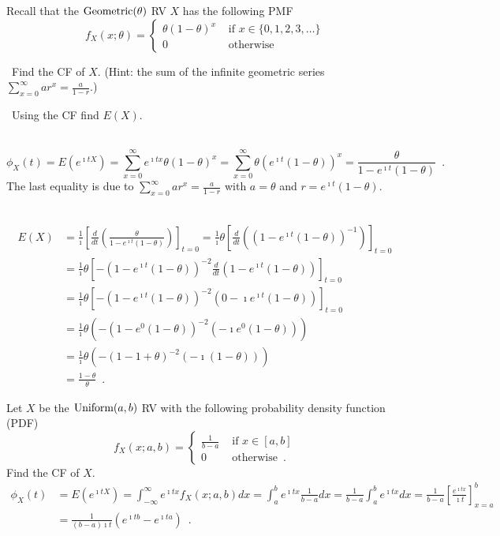 \begin{ExerciseList}
\Exercise
Recall that the $\mbox{{\rm Geometric}}(\theta)$ RV $X$ has the following PMF
\[
f_X(x;\theta) = 
\begin{cases}
\theta (1-\theta)^x & \text{ if } x \in \{0,1,2,3,\ldots\}\\
0 & \text{ otherwise}
\end{cases}
\]
\be
\item~Find the CF of $X$. (Hint: the sum of the infinite geometric series $\sum_{x=0}^{\infty} a r^x = \frac{a}{1-r}$.)
\item~Using the CF find $E(X)$.
\ee
\Answer
~\\
\be
\item~
\[
\phi_X(t) = E \left(e^{\imath t X}\right) = \sum_{x=0}^{\infty} e^{\imath t x}\theta(1-\theta)^x
= \sum_{x=0}^{\infty} \theta \left(e^{\imath t} (1-\theta)\right)^x = \frac{\theta}{1-e^{\imath t} (1-\theta)} \enspace .
\]
The last equality is due to $\sum_{x=0}^{\infty} a r^x = \frac{a}{1-r}$ with $a=\theta$ and $r=e^{\imath t} (1-\theta)$.
\item~
\begin{align*}
E(X)
&= \frac{1}{\imath} \left[ \frac{d}{dt} \left( \frac{\theta}{1-e^{\imath t}(1-\theta)} \right) \right]_{t=0} 
=  \frac{1}{\imath} \theta \left[ \frac{d}{dt} \left( \left(1-e^{\imath t}(1-\theta)\right)^{-1} \right) \right]_{t=0} \\
&= \frac{1}{\imath} \theta \left[ -\left(1-e^{\imath t} (1-\theta)\right)^{-2} \frac{d}{dt} \left( 1-e^{\imath t}(1-\theta)\right) \right]_{t=0}\\ 
&= \frac{1}{\imath} \theta \left[ -\left(1-e^{\imath t} (1-\theta)\right)^{-2} \left( 0-\imath e^{\imath t}(1-\theta)\right) \right]_{t=0}\\
&= \frac{1}{\imath} \theta \left( -\left(1-e^{0} (1-\theta)\right)^{-2} \left( -\imath e^{0}(1-\theta)\right) \right)\\ 
&= \frac{1}{\imath} \theta \left( -\left(1- 1+\theta\right)^{-2} \left( -\imath (1-\theta)\right) \right)\\
&=\frac{1-\theta}{\theta} \enspace .
\end{align*}
\ee

\Exercise
Let $X$ be the $\mbox{{\rm Uniform}}(a,b)$ RV with the following probability density function (PDF)
\[
f_X(x; a,b) = 
\begin{cases}
\frac{1}{b-a} & \text{ if } x \in [a,b] \\
0 & \text{ otherwise} \enspace.
\end{cases}
\]
Find the CF of $X$.
\Answer
~\\
\begin{align*}
\phi_X(t) 
&= E\left( e^{\imath t X} \right) 
= \int_{-\infty}^{\infty} e^{\imath t x} f_X(x;a,b) dx
= \int_{a}^{b} e^{\imath t x} \frac{1}{b-a} dx
= \frac{1}{b-a} \int_{a}^{b} e^{\imath t x} dx
= \frac{1}{b-a} \left[ \frac{e^{\imath t x}}{\imath t} \right]_{x=a}^b\\
&=  \frac{1}{(b-a)\imath t} \left( e^{\imath t b} - e^{\imath t a}\right) \enspace .
\end{align*}


\end{ExerciseList}
